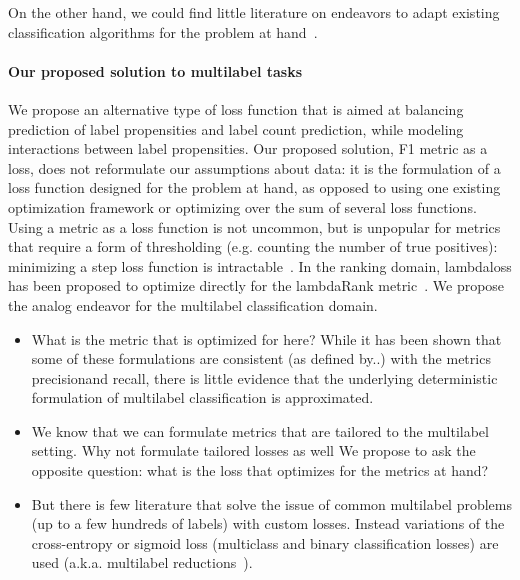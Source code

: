 On the other hand, we could find little literature on endeavors to adapt existing classification algorithms for the problem at hand~\citep{multilabelMethods}.

\paragraph{Our proposed solution to multilabel tasks}
We propose an alternative type of loss function that is aimed at balancing prediction of label propensities and label count prediction, while modeling interactions between label propensities. Our proposed solution, F1 metric as a loss, does not reformulate our assumptions about data: it is the formulation of a loss function designed for the problem at hand, as opposed to using one existing optimization framework or optimizing over the sum of several loss functions.
Using a metric as a loss function is not uncommon, but is unpopular for metrics that require a form of thresholding (e.g. counting the number of true positives): minimizing a step loss function is intractable~\cite{stochasticNegativeMining}. In the ranking domain, lambdaloss has been proposed to optimize directly for the lambdaRank metric~\cite{lambdaLoss}. We propose the analog endeavor for the multilabel classification domain. 

\begin{itemize}
\item{What is the metric that is optimized for here? While it has been shown that some of these formulations are consistent (as defined by..) with the metrics precision\@K and recall\@K, there is little evidence that the underlying deterministic formulation of multilabel classification is approximated.}
\item{We know that we can formulate metrics that are tailored to the multilabel setting. Why not formulate tailored losses as well
We propose to ask the opposite question: what is the loss that optimizes for the metrics at hand?}
\item{But there is few literature that solve the issue of common multilabel problems (up to a few hundreds of labels) with custom losses. Instead variations of the cross-entropy or sigmoid loss (multiclass and binary classification losses) are used (a.k.a. multilabel reductions~\cite{multilabelReduction}).}
\end{itemize}


